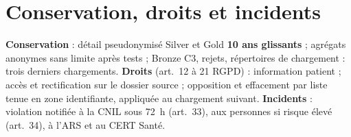 \section{Conservation, droits et incidents}\label{sec:retention}
\textbf{Conservation} : détail pseudonymisé Silver et Gold \textbf{10 ans glissants} ; agrégats anonymes sans limite après tests ; Bronze C3, rejets, répertoires de chargement : trois derniers chargements. \textbf{Droits} (art.~12 à 21 RGPD) : information patient ; accès et rectification sur le dossier source ; opposition et effacement par liste tenue en zone identifiante, appliquée au chargement suivant. \textbf{Incidents} : violation notifiée à la CNIL sous 72~h (art.~33), aux personnes si risque élevé (art.~34), à l'ARS et au CERT Santé.
